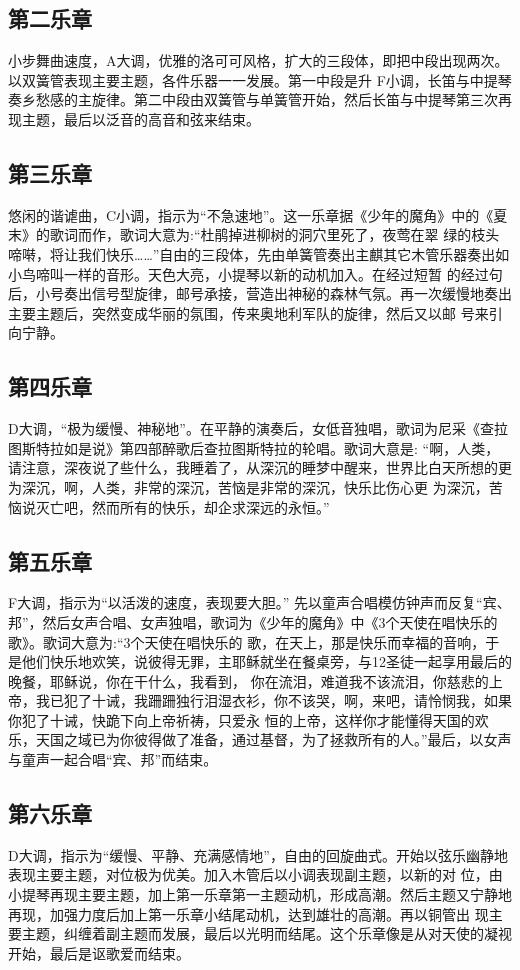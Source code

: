\documentclass[a4paper,left=2.5cm,right=2.5cm,11pt]{article}
\begin{document}
\subsection{第二乐章}
	小步舞曲速度，A大调，优雅的洛可可风格，扩大的三段体，即把中段出现两次。以双簧管表现主要主题，各件乐器一一发展。第一中段是升 F小调，长笛与中提琴奏乡愁感的主旋律。第二中段由双簧管与单簧管开始，然后长笛与中提琴第三次再现主题，最后以泛音的高音和弦来结束。

\subsection{第三乐章}
	悠闲的谐谑曲，C小调，指示为“不急速地”。这一乐章据《少年的魔角》中的《夏末》的歌词而作，歌词大意为:“杜鹃掉进柳树的洞穴里死了，夜莺在翠 绿的枝头啼啭，将让我们快乐……”自由的三段体，先由单簧管奏出主麒其它木管乐器奏出如小鸟啼叫一样的音形。天色大亮，小提琴以新的动机加入。在经过短暂 的经过句后，小号奏出信号型旋律，邮号承接，营造出神秘的森林气氛。再一次缓慢地奏出主要主题后，突然变成华丽的氛围，传来奥地利军队的旋律，然后又以邮 号来引向宁静。

\subsection{第四乐章}
	D大调，“极为缓慢、神秘地”。在平静的演奏后，女低音独唱，歌词为尼采《查拉图斯特拉如是说》第四部醉歌后查拉图斯特拉的轮唱。歌词大意是: “啊，人类，请注意，深夜说了些什么，我睡着了，从深沉的睡梦中醒来，世界比白天所想的更为深沉，啊，人类，非常的深沉，苦恼是非常的深沉，快乐比伤心更 为深沉，苦恼说灭亡吧，然而所有的快乐，却企求深远的永恒。”

\subsection{第五乐章}
	F大调，指示为“以活泼的速度，表现要大胆。” 先以童声合唱模仿钟声而反复“宾、邦”，然后女声合唱、女声独唱，歌词为《少年的魔角》中《3个天使在唱快乐的歌》。歌词大意为:“3个天使在唱快乐的 歌，在天上，那是快乐而幸福的音响，于是他们快乐地欢笑，说彼得无罪，主耶稣就坐在餐桌旁，与12圣徒一起享用最后的晚餐，耶稣说，你在干什么，我看到， 你在流泪，难道我不该流泪，你慈悲的上帝，我已犯了十诫，我跚跚独行泪湿衣衫，你不该哭，啊，来吧，请怜悯我，如果你犯了十诫，快跪下向上帝祈祷，只爱永 恒的上帝，这样你才能懂得天国的欢乐，天国之域已为你彼得做了准备，通过基督，为了拯救所有的人。”最后，以女声与童声一起合唱“宾、邦”而结束。

\subsection{第六乐章}
	D大调，指示为“缓慢、平静、充满感情地”，自由的回旋曲式。开始以弦乐幽静地表现主要主题，对位极为优美。加入木管后以小调表现副主题，以新的对 位，由小提琴再现主要主题，加上第一乐章第一主题动机，形成高潮。然后主题又宁静地再现，加强力度后加上第一乐章小结尾动机，达到雄壮的高潮。再以铜管出 现主要主题，纠缠着副主题而发展，最后以光明而结尾。这个乐章像是从对天使的凝视开始，最后是讴歌爱而结束。
	
\end{document}
